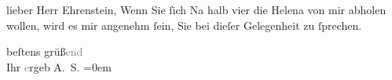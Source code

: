 \pstart{}lieber Herr Ehrenstein,\pend\vspace{0.5em}
\pstart
           Wenn Sie{ }ſich \label{K_L01644-1v}\label{K_L01644-1} Na halb
               vier die Helena von mir abholen wollen, wird es
               mir angenehm{ }ſein, Sie bei dieſer Gelegenheit zu{ }ſprechen.\pend
           
\pstart
           beſtens grüß\textcolor{gray}{end}{\\[\baselineskip]}Ihr \textcolor{gray}{e}rgeb \spacefill\mbox{A. S.}\pend
           \leftskip=0em{}\endnumbering{}  \newcommand{\dateiname}{L01644}\newcommand{\titel}{Arthur Schnitzler an Albert Ehrenstein, 19. 12. 1906}\newcommand{\editorInnen}{Martin Anton Müller und Gerd-Hermann Susen}
